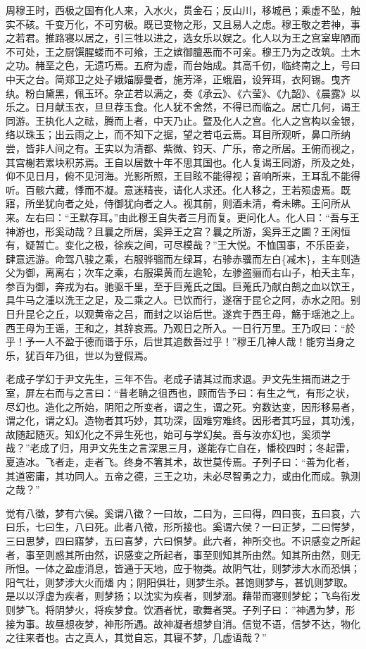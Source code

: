 \documentclass[]{article}
\begin{document}
周穆王时，西极之国有化人来，入水火，贯金石；反山川，移城邑；乘虚不坠，触实不硋。千变万化，不可穷极。既已变物之形，又且易人之虑。穆王敬之若神，事之若君。推路寝以居之，引三牲以进之，选女乐以娱之。化人以为王之宫室卑陋而不可处，王之厨馔腥蝼而不可飨，王之嫔御膻恶而不可亲。穆王乃为之改筑。土木之功。赭垩之色，无遗巧焉。五府为虚，而台始成。其高千仞，临终南之上，号曰中天之台。简郑卫之处子娥媌靡曼者，施芳泽，正蛾眉，设笄珥，衣阿锡。曳齐纨。粉白黛黑，佩玉环。杂芷若以满之，奏《承云》、《六莹》、《九韶》、《晨露》以乐之。日月献玉衣，旦旦荐玉食。化人犹不舍然，不得已而临之。居亡几何，谒王同游。王执化人之祛，腾而上者，中天乃止。暨及化人之宫。化人之宫构以金银，络以珠玉；出云雨之上，而不知下之据，望之若屯云焉。耳目所观听，鼻口所纳尝，皆非人间之有。王实以为清都、紫微、钧天、广乐，帝之所居。王俯而视之，其宫榭若累块积苏焉。王自以居数十年不思其国也。化人复谒王同游，所及之处，仰不见日月，俯不见河海。光影所照，王目眩不能得视；音响所来，王耳乱不能得听。百骸六藏，悸而不凝。意迷精丧，请化人求还。化人移之，王若殒虚焉。既寤，所坐犹向者之处，侍御犹向者之人。视其前，则酒未清，肴未昲。王问所从来。左右曰：``王默存耳。''由此穆王自失者三月而复。更问化人。化人曰：``吾与王神游也，形奚动哉？且曩之所居，奚异王之宫？曩之所游，奚异王之圃？王闲恒有，疑暂亡。变化之极，徐疾之间，可尽模哉？''王大悦。不恤国事，不乐臣妾，肆意远游。命驾八骏之乘，右服骅骝而左绿耳，右骖赤骥而左白\{减木\}，主车则造父为御，离离右；次车之乘，右服渠黄而左逾轮，左骖盗骊而右山子，柏夭主车，参百为御，奔戎为右。驰驱千里，至于巨蒐氏之国。巨蒐氏乃献白鹄之血以饮王，具牛马之湩以洗王之足，及二乘之人。已饮而行，遂宿于昆仑之阿，赤水之阳。别日升昆仑之丘，以观黄帝之吕，而封之以诒后世。遂宾于西王母，觞于瑶池之上。西王母为王谣，王和之，其辞哀焉。乃观日之所入。一日行万里。王乃叹曰：``於乎！予一人不盈于德而谐于乐，后世其追数吾过乎！''穆王几神人哉！能穷当身之乐，犹百年乃徂，世以为登假焉。

老成子学幻于尹文先生，三年不告。老成子请其过而求退。尹文先生揖而进之于室，屏左右而与之言曰：``昔老聃之徂西也，顾而告予曰：有生之气，有形之状，尽幻也。造化之所始，阴阳之所变者，谓之生，谓之死。穷数达变，因形移易者，谓之化，谓之幻。造物者其巧妙，其功深，固难穷难终。因形者其巧显，其功浅，故随起随灭。知幻化之不异生死也，始可与学幻矣。吾与汝亦幻也，奚须学哉？''老成了归，用尹文先生之言深思三月，遂能存亡自在，憣校四时；冬起雷，夏造冰。飞者走，走者飞。终身不箸其术，故世莫传焉。子列子曰：``善为化者，其道密庸，其功同人。五帝之德，三王之功，未必尽智勇之力，或由化而成。孰测之哉？''

觉有八徵，梦有六侯。奚谓八徵？一曰故，二曰为，三曰得，四曰丧，五曰哀，六曰乐，七曰生，八曰死。此者八徵，形所接也。奚谓六侯？一曰正梦，二曰愕梦，三曰思梦，四曰寤梦，五曰喜梦，六曰惧梦。此六者，神所交也。不识感变之所起者，事至则惑其所由然，识感变之所起者，事至则知其所由然。知其所由然，则无所怛。一体之盈虚消息，皆通于天地，应于物类。故阴气壮，则梦涉大水而恐惧；阳气壮，则梦涉大火而燔内；阴阳俱壮，则梦生杀。甚饱则梦与，甚饥则梦取。是以以浮虚为疾者，则梦扬；以沈实为疾者，则梦溺。藉带而寝则梦蛇；飞鸟衔发则梦飞。将阴梦火，将疾梦食。饮酒者忧，歌舞者哭。子列子曰：''神遇为梦，形接为事。故昼想夜梦，神形所遇。故神凝者想梦自消。信觉不语，信梦不达，物化之往来者也。古之真人，其觉自忘，其寝不梦，几虚语哉？''
\end{document}
